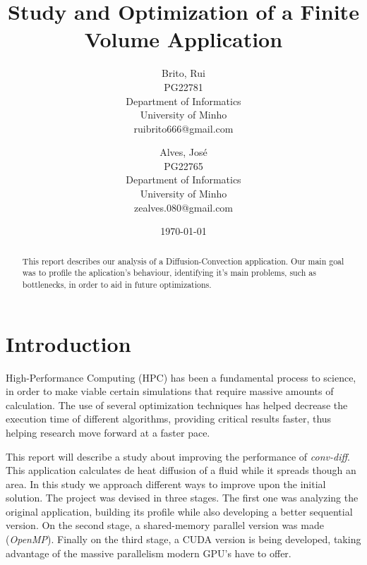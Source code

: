 \documentclass[a4paper,10pt,openright,openbib,twocolumn]{article}
\begin{document}
\title{Study and Optimization of a Finite Volume Application}
\date{\today}
\begin{multicols}{2}
\author{
    Brito, Rui\\
    PG22781\\
    Department of Informatics\\
    University of Minho\\
    ruibrito666@gmail.com
  \and
    Alves, José\\
    PG22765\\
    Department of Informatics\\
    University of Minho\\
    zealves.080@gmail.com
}
\date{}
\maketitle
\end{multicols}

\begin{abstract}
    This report describes our analysis of a Diffusion-Convection application. Our main goal was to profile the aplication's behaviour, identifying it's main problems, such as bottlenecks, in order to aid in future optimizations. 
\end{abstract}

\section{Introduction}    %

High-Performance Computing (HPC) has been a fundamental process to science, in order to make viable certain simulations that require massive amounts of calculation. The use of several optimization techniques has helped decrease the execution time of different algorithms, providing critical results faster, thus helping research move forward at a faster pace.

This report will describe a study about improving the performance of \emph{conv-diff}. This application calculates de heat diffusion of a fluid while it spreads though an area. In this study we approach different ways to improve upon the initial solution. The project was devised in three stages. The first one was analyzing the original application, building its profile while also developing a better sequential version. 
On the second stage, a shared-memory parallel version was made (\emph{OpenMP}). Finally on the third stage, a CUDA version is being developed, taking advantage of the massive parallelism modern GPU's have to offer.
\end{document}
